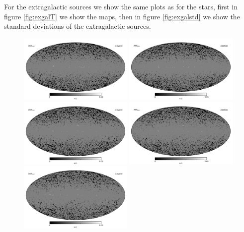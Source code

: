 \documentclass{aa}
\begin{document}
For the extragalactic sources we show the same plots as for the stars, first in figure \ref{fig:exgalT} we show the maps, then in figure \ref{fig:exgalstd} we show the standard deviations of the extragalactic sources. 

\begin{figure}
  \centering
  \includegraphics[width=0.49\textwidth]{figs/starmaps/ptsrc_std_01.pdf}
  \includegraphics[width=0.49\textwidth]{figs/starmaps/ptsrc_std_02.pdf} \\
  \includegraphics[width=0.49\textwidth]{figs/starmaps/ptsrc_std_03.pdf}
  \includegraphics[width=0.49\textwidth]{figs/starmaps/ptsrc_std_04.pdf} \\
  \includegraphics[width=0.49\textwidth]{figs/starmaps/ptsrc_std_05.pdf}

\end{figure}
\end{document}
